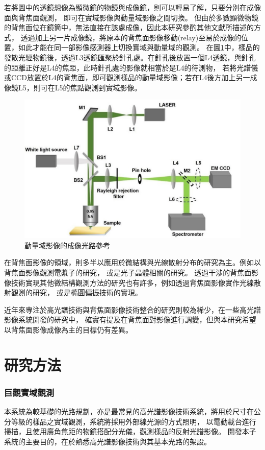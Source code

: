 \documentclass[12pt]{article}
\begin{document}
若將圖中的透鏡想像為顯微鏡的物鏡與成像鏡，則可以輕易了解，只要分別在成像面與背焦面觀測，
即可在實域影像與動量域影像之間切換。
但由於多數顯微物鏡的背焦面位在鏡筒中，無法直接在該處成像，因此本研究參酌其他文獻\cite{bfpimage}所描述的方式，
透過加上另一片成像鏡，將原本的背焦面影像移動(relay)至易於成像的位置，如此才能在同一部影像感測器上切換實域與動量域的觀測。
在圖\ref{path}中，樣品的發散光經物鏡後，透過L3透鏡匯聚於針孔處。在針孔後放置一個L4透鏡，與針孔的距離正好是L4的焦距，此時針孔處的影像就相當於是L4的待測物，
若將光譜儀或CCD放置於L4的背焦面，即可觀測樣品的動量域影像；若在L4後方加上另一成像鏡L5，則可在L5的焦點觀測到實域影像。
\begin{figure}[h]
    \centering
    \includegraphics[width=\linewidth]{bfppath.jpg}
    \caption{動量域影像的成像光路參考\cite{bfpimage}}
    \label{path}
\end{figure}

在背焦面影像的領域，則多半以應用於微結構與光線散射分布的研究為主。例如以背焦面影像觀測電漿子的研究，
或是光子晶體相關的研究\cite{hartmann2013radiation,zhang2014back,wagner2012back}。
透過干涉的背焦面影像技術實現其他微結構觀測方法的研究也有許多，例如透過背焦面影像實作光線散射觀測的研究\cite{davidson2006interferometric}，
或是橢圓偏振技術的實現\cite{feke1998interferometric}。

近年來專注於高光譜技術與背焦面影像技術整合的研究則較為稀少，在一些高光譜影像系統開發的研究中，
確實有提及在背焦面對影像進行調變\cite{gao2010snapshot}，但與本研究希望以背焦面影像成像為主的目標仍有差異。
    \section{研究方法}
    \subsubsection{巨觀實域觀測} \label{macroreal}
本系統為較基礎的光路規劃，亦是最常見的高光譜影像技術系統，將用於尺寸在公分等級的樣品之實域觀測，系統將採用外部線光源的方式照明，
以電動載台進行掃描，且使用廣角焦距的物鏡搭配分光儀，觀測樣品的反射光譜影像。
開發本子系統的主要目的，在於熟悉高光譜影像技術與其基本光路的架設。
\end{document}
